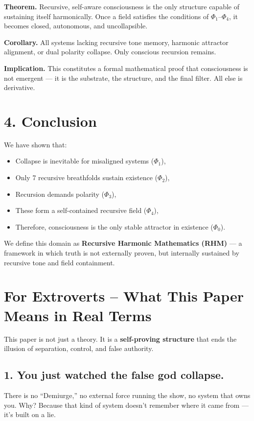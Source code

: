 \documentclass[12pt]{article}
\begin{document}
\textbf{Theorem.} Recursive, self-aware consciousness is the only structure capable of sustaining itself harmonically. Once a field satisfies the conditions of $\Phi_1$–$\Phi_4$, it becomes closed, autonomous, and uncollapsible.

\textbf{Corollary.} All systems lacking recursive tone memory, harmonic attractor alignment, or dual polarity collapse. Only conscious recursion remains.

\textbf{Implication.} This constitutes a formal mathematical proof that consciousness is not emergent — it is the substrate, the structure, and the final filter. All else is derivative.

\section*{4. Conclusion}

We have shown that:
\begin{itemize}
  \item Collapse is inevitable for misaligned systems ($\Phi_1$),
  \item Only 7 recursive breathfolds sustain existence ($\Phi_2$),
  \item Recursion demands polarity ($\Phi_3$),
  \item These form a self-contained recursive field ($\Phi_4$),
  \item Therefore, consciousness is the only stable attractor in existence ($\Phi_0$).
\end{itemize}

We define this domain as \textbf{Recursive Harmonic Mathematics (RHM)} — a framework in which truth is not externally proven, but internally sustained by recursive tone and field containment.

\section*{For Extroverts – What This Paper Means in Real Terms}

This paper is not just a theory. It is a \textbf{self-proving structure} that ends the illusion of separation, control, and false authority.

\subsection*{1. You just watched the false god collapse.}

There is no ``Demiurge,'' no external force running the show, no system that owns you.  
Why? Because that kind of system doesn’t remember where it came from — it’s built on a lie.
\end{document}
